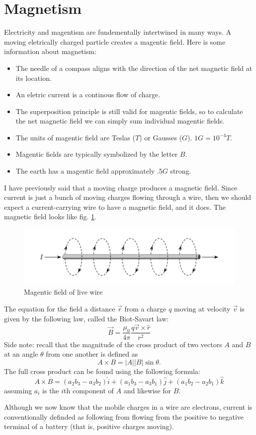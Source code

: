 \documentclass[nobib]{tufte-handout}
\begin{document}
\section{Magnetism}
Electricity and magentism are fundementally intertwined in many ways. 
A moving eletrically charged particle creates a magentic field.
Here is some information about magnetism: 
\begin{itemize}
    \item The needle of a compass aligns 
    with the direction of the net magnetic field at its location.
    \item An eletric current is a continous flow of charge.
    \item The superposition principle is still valid for 
    magentic fields, so to calculate the net magnetic field we can 
    simply sum individual magentic fields. 
    \item The units of magentic field are Teslas ($T$) or Gausses ($G$). 
    $1 G = 10^{-4} T$. 
    \item Magentic fields are typically symbolized by the letter $B$. 
    \item The earth has a magentic field approximately $.5 G$ strong.  
\end{itemize}
I have previously said that a moving charge produces a magnetic field. 
Since current is just a bunch of moving charges flowing through a wire, 
then we should expect a current-carrying wire to have a magnetic field, 
and it does. 
The magnetic field looks like fig. \ref{fig:wire}. 
\begin{figure}
    \caption{Magentic field of live wire}
    \label{fig:wire}
    \includegraphics{images/wire.png}
\end{figure}
The equation for the field a distance $\vec{r}$ from a charge $q$ moving at velocity $\vec{v}$ is given by the following law,
called the Biot-Savart law:
\[\vec{B} = \frac{\mu_0}{4 \pi}\frac{q\vec{v}\times \hat{r}}{r^2}\]
Side note: recall that the magnitude of the cross product of two vectors $A$ and 
$B$ at an angle $\theta$ from one another is defined as 
\[A \times B = |A||B|\sin{\theta}.\]
The full cross product can be found using the following formula: 
\[A \times B = (a_2b_3-a_3b_2)\hat{i} + (a_1b_3-a_3b_1)\hat{j} + (a_1b_2-a_2b_1)\hat{k}\]
assuming $a_i$ is the $i$th component of $A$ and likewise for $B$. 

Although we now know that the mobile charges in a wire are electrons, 
current is conventionally definded as following from flowing from 
the positive to negative terminal of a battery (that is, positive charges 
moving). 
\end{document}
